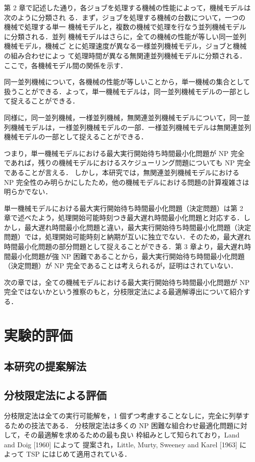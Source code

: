 \documentclass[12pt]{optlab-bachelor}
\begin{document}
  第 2 章で記述した通り，各ジョブを処理する機械の性能によって，機械モデルは次のように分類され
  る．まず，ジョブを処理する機械の台数について，一つの機械で処理する単一
  機械モデルと，複数の機械で処理を行なう並列機械モデルに分類される．並列
  機械モデルはさらに，全ての機械の性能が等しい同一並列機械モデル，機械ご
  とに処理速度が異なる一様並列機械モデル，ジョブと機械の組み合わせによっ
  て処理時間が異なる無関連並列機械モデルに分類される．ここで，各機械モデル間の関係を示す．

  同一並列機械について，各機械の性能が等しいことから，単一機械の集合として扱うことができる．よって，単一機械モデルは，同一並列機械モデルの一部として捉えることができる．

  同様に，同一並列機械，一様並列機械，無関連並列機械モデルについて，同一並列機械モデルは，一様並列機械モデルの一部．一様並列機械モデルは無関連並列機械モデルの一部として捉えることができる．

  つまり，単一機械モデルにおける最大実行開始待ち時間最小化問題が NP 完全であれば，残りの機械モデルにおけるスケジューリング問題についても NP 完全であることが言える．
  しかし，本研究では，無関連並列機械モデルにおける NP 完全性のみ明らかにしたため，他の機械モデルにおける問題の計算複雑さは明らかでない．

  単一機械モデルにおける最大実行開始待ち時間最小化問題（決定問題）は第 2 章で述べたよう，処理開始可能時刻つき最大遅れ時間最小化問題と対応する．しかし，最大遅れ時間最小化問題と違い，最大実行開始待ち時間最小化問題（決定問題）では，処理開始可能時刻と納期が互いに独立でない．そのため，最大遅れ時間最小化問題の部分問題として捉えることができる．第 3 章より，最大遅れ時間最小化問題が強 NP 困難であることから，最大実行開始待ち時間最小化問題（決定問題）が NP 完全であることは考えられるが，証明はされていない．

  次の章では，全ての機械モデルにおける最大実行開始待ち時間最小化問題が NP 完全ではないかという推察のもと，分枝限定法による最適解導出について紹介する．

  \chapter{実験的評価}
  \section{本研究の提案解法}
  \section{分枝限定法による評価}
  分枝限定法は全ての実行可能解を，1 個ずつ考慮することなしに，完全に列挙するための技法である．
  分枝限定法は多くの NP 困難な組合わせ最適化問題に対して，その最適解を求めるための最も良い
  枠組みとして知られており，Land and Doig [1960] \cite{BandB} によって
  提案され，Little, Murty, Sweeney and Karel [1963] \cite{BandB2}
  によって TSP にはじめて適用されている．
\end{document}
